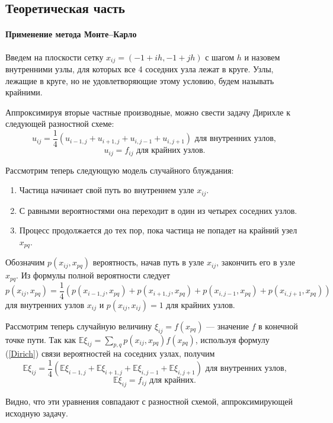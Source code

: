 \documentclass[16pt]{article}
\begin{document}
\subsection{Теоретическая часть}
\paragraph{Применение метода Монте--Карло}
Введем на плоскости сетку $x_{ij} = (-1 + ih, -1 + jh)$ с шагом $h$ и назовем внутренними узлы, для которых все 4 соседних узла лежат в круге. Узлы, лежащие в круге, но не удовлетворяющие этому условию, будем называть крайними. 

Аппроксимируя вторые частные производные, можно свести задачу Дирихле к следующей разностной схеме:
$$u_{ij} = \dfrac14(u_{i-1,j} + u_{i+1, j} + u_{i, j-1} + u_{i,j+1}) \text{ для внутренних узлов},$$
$$u_{ij} = f_{ij} \text{ для крайних узлов}.$$

Рассмотрим теперь следующую модель случайного блуждания: 
\begin{enumerate}
	\item Частица начинает свой путь во внутреннем узле $x_{ij}$.
	\item С равными вероятностями она переходит в один из четырех соседних узлов.
	\item Процесс продолжается до тех пор, пока частица не попадет на крайний узел $x_{pq}$.
\end{enumerate}


Обозначим $p(x_{ij}, x_{pq})$ вероятность, начав путь в узле $x_{ij}$, закончить его в узле $x_{pq}$. Из формулы полной вероятности следует
\begin{equation}\label{Dirich}
p(x_{ij}, x_{pq}) = \dfrac14(p(x_{i-1,j}, x_{pq}) + p(x_{i+1, j}, x_{pq}) + p(x_{i, j-1}, x_{pq}) + p(x_{i,j+1}, x_{pq}))
\end{equation}
для внутренних узлов $x_{ij}$ и $p(x_{ij}, x_{ij}) = 1$ для крайних узлов.

Рассмотрим теперь случайную величину $\xi_{ij} = f(x_{pq})$ --- значение $f$ в конечной точке пути.
Так как $\mathbb{E}\xi_{ij} = \sum_{p, q}p(x_{ij}, x_{pq})f(x_{pq})$, используя формулу (\ref{Dirich}) связи вероятностей на соседних узлах, получим
$$\mathbb{E}\xi_{ij} = \dfrac14(\mathbb{E}\xi_{i-1,j} + \mathbb{E}\xi_{i+1, j} + \mathbb{E}\xi_{i, j-1} + \mathbb{E}\xi_{i,j+1}) \text{ для внутренних узлов,}$$
$$\mathbb{E}\xi_{ij} = f_{ij} \text{ для крайних}.$$

Видно, что эти уравнения совпадают с разностной схемой, аппроксимирующей исходную задачу.
\end{document}
